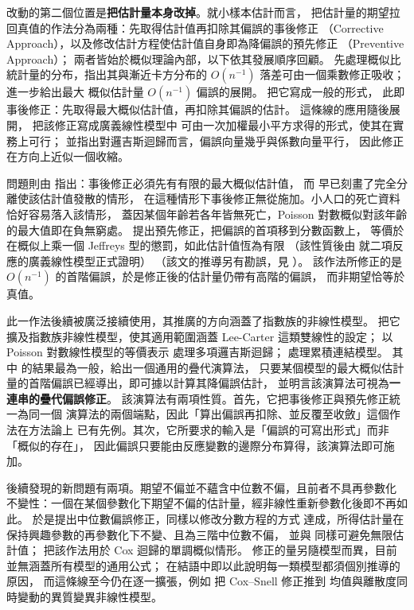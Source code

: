 \documentclass[UTF8, fontset=macnew, a4paper, 12pt]{ctexart}
\begin{document}
改動的第二個位置是\textbf{把估計量本身改掉}。就小樣本估計而言，
把估計量的期望拉回真值的作法分為兩種：先取得估計值再扣除其偏誤的事後修正
（Corrective Approach），以及修改估計方程使估計值自身即為降偏誤的預先修正
（Preventive Approach）；
兩者皆始於概似理論內部，以下依其發展順序回顧。
\citet{bartlett1937} 先處理概似比統計量的分布，指出其與漸近卡方分布的
$O(n^{-1})$ 落差可由一個乘數修正吸收；\citet{bartlett1953} 進一步給出最大
概似估計量 $O(n^{-1})$ 偏誤的展開。\citet{coxsnell1968} 把它寫成一般的形式，
此即事後修正：先取得最大概似估計值，再扣除其偏誤的估計。
這條線的應用隨後展開，\citet{cordeiro1991} 把該修正寫成廣義線性模型中
可由一次加權最小平方求得的形式，使其在實務上可行；
並指出對邏吉斯迴歸而言，偏誤向量幾乎與係數向量平行，
因此修正在方向上近似一個收縮。

問題則由 \citet{firth1993} 指出：事後修正必須先有有限的最大概似估計值，
而 \citet{albert1984} 早已刻畫了完全分離使該估計值發散的情形，
在這種情形下事後修正無從施加。小人口的死亡資料恰好容易落入該情形，
蓋因某個年齡若各年皆無死亡，Poisson 對數概似對該年齡的最大值即在負無窮處。
\citet{firth1993} 提出預先修正，把偏誤的首項移到分數函數上，
等價於在概似上乘一個 Jeffreys 型的懲罰，如此估計值恆為有限
（該性質後由 \citet{kosmidis2021} 就二項反應的廣義線性模型正式證明）
（該文的推導另有勘誤，見 \citealp{firth1995}）。
該作法所修正的是 $O(n^{-1})$ 的首階偏誤，於是修正後的估計量仍帶有高階的偏誤，
而非期望恰等於真值。

此一作法後續被廣泛接續使用，其推廣的方向涵蓋了指數族的非線性模型。
\citet{kosmidis2009} 把它擴及指數族非線性模型，使其適用範圍涵蓋 Lee-Carter
這類雙線性的設定；\citet{kosmidis2011} 以 Poisson 對數線性模型的等價表示
處理多項邏吉斯迴歸；\citet{kosmidis2014} 處理累積連結模型。
其中 \citet{kosmidis2010} 的結果最為一般，給出一個通用的疊代演算法，
只要某個模型的最大概似估計量的首階偏誤已經導出，即可據以計算其降偏誤估計，
並明言該演算法可視為\textbf{一連串的疊代偏誤修正}。
該演算法有兩項性質。首先，它把事後修正與預先修正統一為同一個
演算法的兩個端點，因此「算出偏誤再扣除、並反覆至收斂」這個作法在方法論上
已有先例。其次，它所要求的輸入是「偏誤的可寫出形式」而非「概似的存在」，
因此偏誤只要能由反應變數的邊際分布算得，該演算法即可施加。

後續發現的新問題有兩項。期望不偏並不蘊含中位數不偏，且前者不具再參數化
不變性：一個在某個參數化下期望不偏的估計量，經非線性重新參數化後即不再如此。
\citet{kennepagui2017} 於是提出中位數偏誤修正，同樣以修改分數方程的方式
達成，所得估計量在保持興趣參數的再參數化下不變、且為三階中位數不偏，
並與 \citet{firth1993} 同樣可避免無限估計值；
\citet{kennepagui2020} 把該作法用於 Cox 迴歸的單調概似情形。
修正的量另隨模型而異，目前並無涵蓋所有模型的通用公式；
\citet{cordeiro1991} 在結語中即以此說明每一類模型都須個別推導的原因，
而這條線至今仍在逐一擴張，例如 \citet{sossa2026} 把 Cox--Snell 修正推到
均值與離散度同時變動的異質變異非線性模型。
\end{document}
